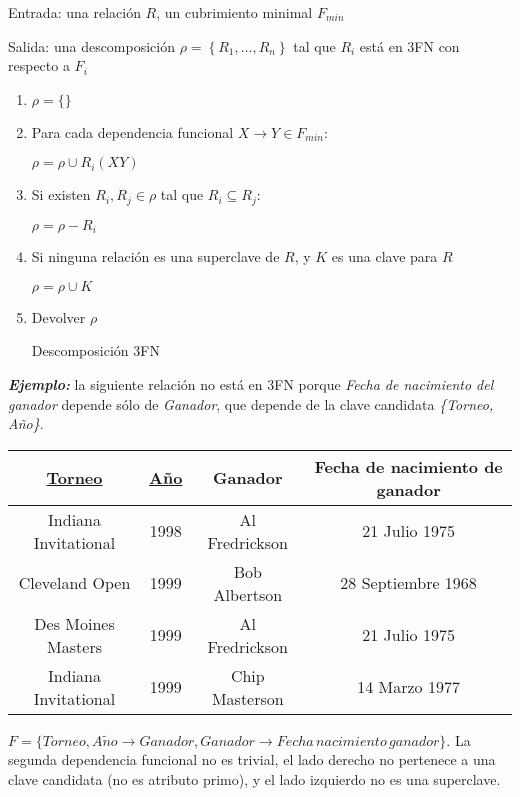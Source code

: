 \documentclass[a4paper, twoside]{article}
\begin{document}
\begin{algorithm}[H]
	Entrada: una relación $R$, un cubrimiento minimal $F_{min}$

	Salida: una descomposición $\rho=\left\{ R_{1},\ldots,R_{n}\right\}$ tal que $R_{i}$ está en 3FN con respecto a $F_{i}$
	\begin{enumerate}
		\item $\rho=\{\}$
		\item Para cada dependencia funcional $X\to Y\in F_{min}$:
			
		$\rho=\rho\cup R_{i}\left(XY\right)$

		\item Si existen $R_{i},R_{j}\in\rho$ tal que $R_{i}\subseteq R_{j}$:

		$\rho=\rho-R_{i}$

		\item Si ninguna relación es una superclave de $R$, y $K$ es una clave para $R$

		$\rho=\rho\cup K$

		\item Devolver $\rho$\protect\caption{Descomposición 3FN}
	\end{enumerate}
\end{algorithm}

\textbf{\emph{Ejemplo:}} la siguiente relación no está en 3FN porque \emph{Fecha de nacimiento del ganador} depende sólo de \emph{Ganador}, que depende de la clave candidata \emph{\{Torneo, Año\}}.

\begin{center}
	\begin{tabular}{|c|c|c|c|}
		\hline 
		\uline{Torneo} & \uline{Año} & Ganador & Fecha de nacimiento de ganador\\
		\hline 
		\hline 
		Indiana Invitational  & 1998 & Al Fredrickson  & 21 Julio 1975\\
		\hline 
		Cleveland Open  & 1999 & Bob Albertson  & 28 Septiembre 1968\\
		\hline 
		Des Moines Masters  & 1999 & Al Fredrickson  & 21 Julio 1975\\
		\hline 
		Indiana Invitational  & 1999 & Chip Masterson  & 14 Marzo 1977\\
		\hline 
	\end{tabular}
\end{center}

$F=\{Torneo,A\tilde{n}o\to Ganador,Ganador\to Fecha\, nacimiento\, ganador\}$. La segunda dependencia funcional no es trivial, el lado derecho no pertenece a una clave candidata (no es atributo primo), y el lado izquierdo no es una superclave.
\end{document}
